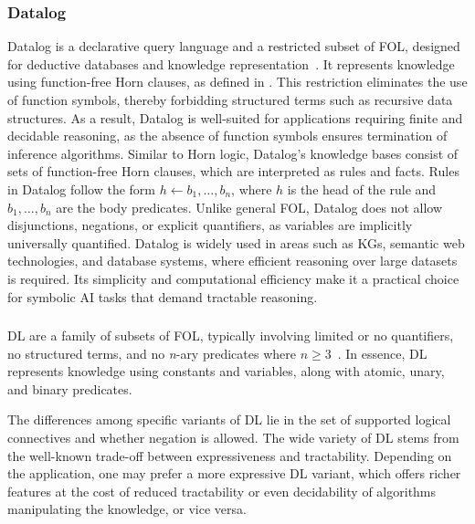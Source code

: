 \subsubsection{Datalog}\label{subsubsec:datalog}
%
Datalog is a declarative query language and a restricted subset of \gls{FOL}, designed for deductive databases and knowledge representation~\cite{DBLP:journals/jcss/AjtaiG94}.
%
It represents knowledge using function-free Horn clauses, as defined in .
%
This restriction eliminates the use of function symbols, thereby forbidding structured terms such as recursive data structures.
%
As a result, Datalog is well-suited for applications requiring finite and decidable reasoning, as the absence of function symbols ensures termination of inference algorithms.
%
Similar to Horn logic, Datalog’s knowledge bases consist of sets of function-free Horn clauses, which are interpreted as rules and facts.
%
Rules in Datalog follow the form \(h \gets b_1, \dots, b_n\), where \(h\) is the head of the rule and \(b_1, \dots, b_n\) are the body predicates.
%
Unlike general \gls{FOL}, Datalog does not allow disjunctions, negations, or explicit quantifiers, as variables are implicitly universally quantified.
%
Datalog is widely used in areas such as \glspl{KG}, semantic web technologies, and database systems, where efficient reasoning over large datasets is required.
%
Its simplicity and computational efficiency make it a practical choice for symbolic \gls{AI} tasks that demand tractable reasoning.


\subsubsection[Description logic]{}\label{subsubsec:dl}
%
\Gls{DL} are a family of subsets of \gls{FOL}, typically involving limited or no quantifiers, no structured terms, and no \textit{n}-ary predicates where \(n \geq 3\)~\cite{DBLP:books/daglib/0041477}.
%
In essence, \gls{DL} represents knowledge using constants and variables, along with atomic, unary, and binary predicates.


The differences among specific variants of \gls{DL} lie in the set of supported logical connectives and whether negation is allowed.
%
The wide variety of \gls{DL} stems from the well-known trade-off between expressiveness and tractability.
%
Depending on the application, one may prefer a more expressive \gls{DL} variant, which offers richer features at the cost of reduced tractability or even decidability of algorithms manipulating the knowledge, or vice versa.


